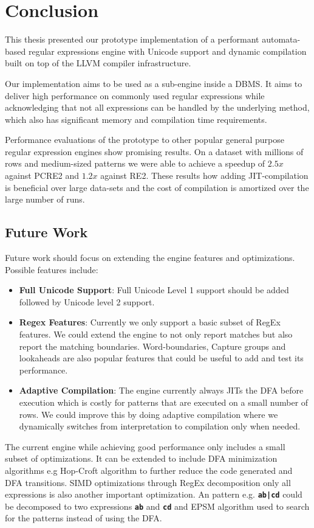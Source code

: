 \chapter{Conclusion}\label{chapter:conclusion}
This thesis presented our prototype implementation of a performant automata-based regular expressions engine with Unicode support and dynamic compilation built on top of the LLVM compiler infrastructure.

Our implementation aims to be used as a sub-engine inside a DBMS. It aims to deliver high performance on commonly used regular expressions while acknowledging that not all expressions can be handled by the underlying method, which also has significant memory and compilation time requirements.

Performance evaluations of the prototype to other popular general purpose regular expression engines show promising results. On a dataset with millions of rows and medium-sized patterns we were able to achieve a speedup of $2.5x$ against PCRE2 and $1.2x$ against RE2. These results how adding JIT-compilation is beneficial over large data-sets and the cost of compilation is amortized over the large number
of runs.

\section{Future Work}

Future work should focus on extending the engine features and optimizations. Possible features include:
\begin{itemize}
    \item \textbf{Full Unicode Support}: Full Unicode Level 1 support should be added followed by Unicode level 2 support.
    \item \textbf{Regex Features}: Currently we only support a basic subset of RegEx features. We could extend the engine to not only report matches but also report the matching boundaries. Word-boundaries, Capture groups and lookaheads are also popular features that could be useful to add and test its performance.  
    \item \textbf{Adaptive Compilation}: The engine currently always JITs the DFA before execution which is costly for patterns that are executed on a small number of rows. We could improve this by doing adaptive compilation where we dynamically switches from interpretation to compilation only when needed.
\end{itemize}

The current engine while achieving good performance only includes a small subset of optimizations. It can be extended to include  DFA minimization algorithms e.g Hop-Croft algorithm to further reduce the code generated and DFA transitions. SIMD optimizations through RegEx decomposition only all expressions is also another important optimization. An pattern e.g. \texttt{\textbf{ab|cd}} could be decomposed to two expressions \texttt{\textbf{ab}} and \texttt{\textbf{cd}} and EPSM algorithm used to search for the patterns instead of using the DFA.
